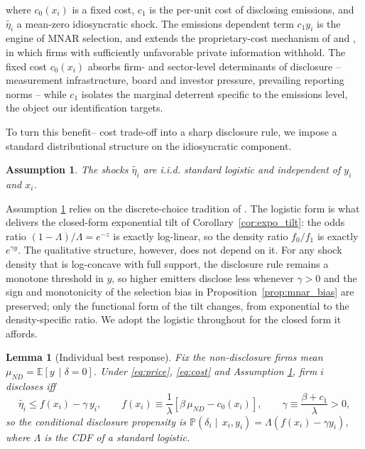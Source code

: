 \documentclass[a4paper,12pt]{article}
\newcommand{\citet}[1]{\textcite{#1}}
\newtheorem{assumption}[theorem]{Assumption}
\newtheorem{lemma}[theorem]{Lemma}
\begin{document}
where $c_0(x_i)$ is a fixed cost, $c_1$ is the per-unit cost of disclosing emissions, and $\tilde{\eta_i}$ a mean-zero idiosyncratic shock. The emissions dependent term $c_1 y_i$ is the engine of MNAR selection, and extends the proprietary-cost mechanism of \citet{verrecchia1983discretionary} and \cite{dye1985disclosure}, in which firms with sufficiently unfavorable private information withhold. The fixed cost $c_0(x_i)$ absorbs firm- and sector-level determinants of disclosure -- measurement infrastructure, board and investor pressure, prevailing reporting norms -- while $c_1$ isolates the marginal deterrent specific to the emissions level, the object our identification targets.

To turn this benefit-- cost trade-off into a sharp disclosure rule, we impose a standard distributional structure on the idiosyncratic component.

\begin{assumption}
\label{ass:logistic_shocks}
    The shocks $\tilde{\eta_i}$ are i.i.d. standard logistic and independent of $y_i$ and $x_i$. 
\end{assumption}

Assumption \ref{ass:logistic_shocks} relies on the discrete-choice tradition of \citet{mcfadden1972conditional}. The logistic form is what delivers the closed-form exponential tilt of Corollary~\ref{cor:expo_tilt}: the odds ratio $(1-\Lambda)/\Lambda = e^{-z}$ is exactly log-linear, so the density ratio $f_0/f_1$ is exactly $e^{\gamma y}$. The qualitative structure, however, does not depend on it. For any shock density that is log-concave with full support, the disclosure rule remains a monotone threshold in $y$, so higher emitters disclose less whenever $\gamma>0$ and the sign and monotonicity of the selection bias in Proposition~\ref{prop:mnar_bias} are preserved; only the functional form of the tilt changes, from exponential to the density-specific ratio. We adopt the logistic throughout for the closed form it affords.

\begin{lemma}[Individual best response]
\label{lemma:indiv_best_resp} Fix the non-disclosure firms mean $\mu_{ND} = \mathbb{E}[y \, \mid \delta = 0]$. Under \eqref{eq:price}, \eqref{eq:cost} and Assumption \ref{ass:logistic_shocks}, firm $i$ discloses iff 
\begin{equation}
\label{eq:disclosure_threshold}
    \tilde{\eta_i} \leq f(x_i) - \gamma \, y_i, \qquad f(x_i) \equiv \frac{1}{\lambda}[\beta \, \mu_{ND} - c_0(x_i)], \qquad \gamma \equiv \frac{\beta + c_1}{\lambda} > 0, 
\end{equation}
so the conditional disclosure propensity is $\mathbb{P}(\delta_i \mid \, x_i, y_i) = \Lambda(f(x_i) - \gamma y_i)$, where $\Lambda$ is the CDF of a standard logistic. 
\end{lemma}
\end{document}
